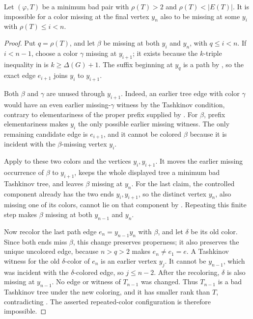 \begin{lemma}
Let \((\varphi,T)\) be a minimum bad pair with \(\rho(T)>2\) and
\(\rho(T)<|E(T)|\).  It is impossible for a color missing at the final
vertex \(y_n\) also to be missing at some \(y_i\) with
\(\rho(T)\le i<n\).
\end{lemma}
\begin{proof}
Put \(q=\rho(T)\), and let \(\beta\) be missing at both \(y_i\) and
\(y_n\), with \(q\le i<n\).  If \(i<n-1\), choose a color \(\gamma\)
missing at \(y_{i+1}\); it exists because the \(k\)-triple inequality in
 is \(k\ge\Delta(G)+1\).  The suffix beginning at \(y_q\)
is a path by , so the exact edge \(e_{i+1}\)
joins \(y_i\) to \(y_{i+1}\).

Both \(\beta\) and \(\gamma\) are unused through \(y_{i+1}\).  Indeed,
an earlier tree edge with color \(\gamma\) would have an even earlier
missing-\(\gamma\) witness by the Tashkinov condition, contrary to
elementariness of the proper prefix supplied by
.  For \(\beta\), prefix
elementariness makes \(y_i\) the only possible earlier missing witness.
The only remaining candidate edge is \(e_{i+1}\), and it cannot be colored
\(\beta\) because it is incident with the \(\beta\)-missing vertex
\(y_i\).

Apply  to these two colors and the
vertices \(y_i,y_{i+1}\).  It moves the earlier missing occurrence of
\(\beta\) to \(y_{i+1}\), keeps the whole displayed tree a minimum bad
Tashkinov tree, and leaves \(\beta\) missing at \(y_n\).  For the last
claim, the controlled component already has the two ends
\(y_i,y_{i+1}\), so the distinct vertex \(y_n\), also missing one of its
colors, cannot lie on that component by
.  Repeating this finite step makes
\(\beta\) missing at both \(y_{n-1}\) and \(y_n\).

Now recolor the last path edge \(e_n=y_{n-1}y_n\) with \(\beta\), and let
\(\delta\) be its old color.  Since both ends miss \(\beta\), this change
preserves properness; it also preserves the unique uncolored edge, because
\(n>q>2\) makes \(e_n\ne e_1=e\).  A Tashkinov witness for the old
\(\delta\)-color of \(e_n\) is an earlier vertex \(y_j\).  It cannot be
\(y_{n-1}\), which was incident with the \(\delta\)-colored edge, so
\(j\le n-2\).  After the recoloring, \(\delta\) is also missing at
\(y_{n-1}\).  No edge or witness of \(T_{n-1}\) was changed.  Thus
\(T_{n-1}\) is a bad Tashkinov tree under the new coloring, and it has
smaller rank than \(T\), contradicting
.  The asserted repeated-color
configuration is therefore impossible.
\end{proof}
